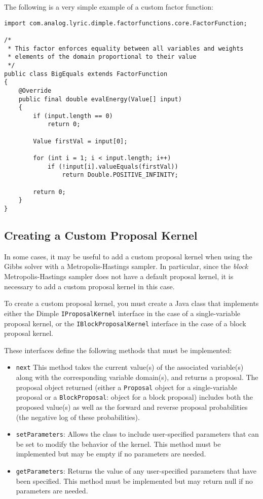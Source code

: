 The following is a very simple example of a custom factor function:

\begin{lstlisting}
import com.analog.lyric.dimple.factorfunctions.core.FactorFunction;

/*
 * This factor enforces equality between all variables and weights
 * elements of the domain proportional to their value
 */
public class BigEquals extends FactorFunction
{	
    @Override
    public final double evalEnergy(Value[] input)
    {
        if (input.length == 0)
            return 0;
	    	
        Value firstVal = input[0];
	    	
        for (int i = 1; i < input.length; i++)
            if (!input[i].valueEquals(firstVal))
                return Double.POSITIVE_INFINITY;
	    	
        return 0;
    }
}
\end{lstlisting}




\subsection{Creating a Custom Proposal Kernel}
\label{sec:CreatingACustomProposalKernel}

In some cases, it may be useful to add a custom proposal kernel when using the Gibbs solver with a Metropolis-Hastings sampler.  In particular, since the \emph{block} Metropolis-Hastings sampler does not have a default proposal kernel, it is necessary to add a custom proposal kernel in this case.

To create a custom proposal kernel, you must create a Java class that implements either the Dimple \texttt{IProposalKernel} interface in the case of a single-variable proposal kernel, or the \texttt{IBlockProposalKernel} interface in the case of a block proposal kernel.

These interfaces define the following methods that must be implemented:
%
\begin{itemize}
%
\item \texttt{next} This method takes the current value(s) of the associated variable(s) along with the corresponding variable domain(s), and returns a proposal.  The proposal object returned (either a \texttt{Proposal} object for a single-variable proposal or a \texttt{BlockProposal}: object for a block proposal) includes both the proposed value(s) as well as the forward and reverse proposal probabilities (the negative log of these probabilities).
%
\item \texttt{setParameters}: Allows the class to include user-specified parameters that can be set to modify the behavior of the kernel.  This method must be implemented but may be empty if no parameters are needed.
%
\item \texttt{getParameters}: Returns the value of any user-specified parameters that have been specified.  This method must be implemented but may return null if no parameters are needed.
%
\end{itemize}


